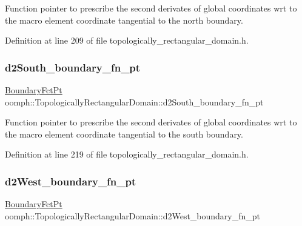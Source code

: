 Function pointer to prescribe the second derivates of global coordinates wrt to the macro element coordinate tangential to the north boundary. 



Definition at line 209 of file topologically\+\_\+rectangular\+\_\+domain.\+h.

\mbox{\label{classoomph_1_1TopologicallyRectangularDomain_a71020e52d5dd8cc0be51b9b466a294dc}} 
\subsubsection{\texorpdfstring{d2\+South\+\_\+boundary\+\_\+fn\+\_\+pt}{d2South\_boundary\_fn\_pt}}
{\footnotesize\ttfamily \hyperlink{classoomph_1_1TopologicallyRectangularDomain_a8b2e24f5500d86c93aef509c5410e7cc}{Boundary\+Fct\+Pt} oomph\+::\+Topologically\+Rectangular\+Domain\+::d2\+South\+\_\+boundary\+\_\+fn\+\_\+pt\hspace{0.3cm}{\ttfamily [private]}}



Function pointer to prescribe the second derivates of global coordinates wrt to the macro element coordinate tangential to the south boundary. 



Definition at line 219 of file topologically\+\_\+rectangular\+\_\+domain.\+h.

\mbox{\label{classoomph_1_1TopologicallyRectangularDomain_a55aaf2cfce3da535d9dd9ac5e990be3b}} 
\subsubsection{\texorpdfstring{d2\+West\+\_\+boundary\+\_\+fn\+\_\+pt}{d2West\_boundary\_fn\_pt}}
{\footnotesize\ttfamily \hyperlink{classoomph_1_1TopologicallyRectangularDomain_a8b2e24f5500d86c93aef509c5410e7cc}{Boundary\+Fct\+Pt} oomph\+::\+Topologically\+Rectangular\+Domain\+::d2\+West\+\_\+boundary\+\_\+fn\+\_\+pt\hspace{0.3cm}{\ttfamily [private]}}



